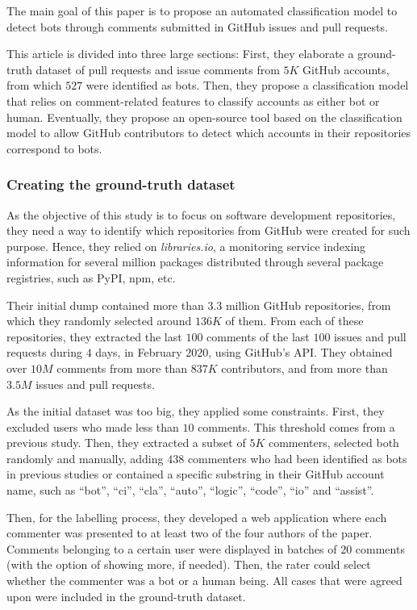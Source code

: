 \documentclass[a4paper, 12pt]{book}
\begin{document}
The main goal of this paper is to propose an automated classification model to detect bots through comments submitted in GitHub issues and pull requests.

This article is divided into three large sections: First, they elaborate a ground-truth dataset of pull requests and issue comments from $5K$ GitHub accounts, from which $527$ were identified as bots. Then, they propose a classification model that relies on comment-related features to classify accounts as either bot or human. Eventually, they propose an open-source tool based on the classification model to allow GitHub contributors to detect which accounts in their repositories correspond to bots.

\subsubsection{Creating the ground-truth dataset}
\label{sssec:golzadeh-dataset}

As the objective of this study is to focus on software development repositories, they need a way to identify which repositories from GitHub were created for such purpose. Hence, they relied on \textit{libraries.io}, a monitoring service indexing information for several million packages distributed through several package registries, such as PyPI, npm, etc. 

Their initial dump contained more than $3.3$ million GitHub repositories, from which they randomly selected around $136K$ of them. From each of these repositories, they extracted the last $100$ comments of the last $100$ issues and pull requests during $4$ days, in February 2020, using GitHub's API. They obtained over $10M$ comments from more than $837K$ contributors, and from more than $3.5M$ issues and pull requests.

As the initial dataset was too big, they applied some constraints. First, they excluded users who made less than $10$ comments. This threshold comes from a previous study. Then, they extracted a subset of $5K$ commenters, selected both randomly and manually, adding $438$ commenters who had been identified as bots in previous studies or contained a specific substring in their GitHub account name, such as ``bot'', ``ci'', ``cla'', ``auto'', ``logic'', ``code'', ``io'' and ``assist''.

Then, for the labelling process, they developed a web application where each commenter was presented to at least two of the four authors of the paper. Comments belonging to a certain user were displayed in batches of $20$ comments (with the option of showing more, if needed). Then, the rater could select whether the commenter was a bot or a human being. All cases that were agreed upon were included in the ground-truth dataset.
\end{document}
